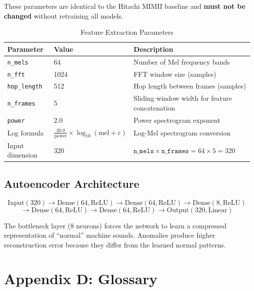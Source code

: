 \documentclass[10pt, a4paper, oneside]{report}
\begin{document}
These parameters are identical to the Hitachi MIMII baseline and \textbf{must not be changed} without retraining all models.

\begin{table}[H]
\centering
\caption{Feature Extraction Parameters}
\label{tab:feature-params}
\begin{tabularx}{\textwidth}{l l X}
  \toprule
  \textbf{Parameter} & \textbf{Value} & \textbf{Description} \\
  \midrule
  \texttt{n\_mels}       & 64    & Number of Mel frequency bands \\
  \texttt{n\_fft}        & 1024  & FFT window size (samples) \\
  \texttt{hop\_length}   & 512   & Hop length between frames (samples) \\
  \texttt{n\_frames}     & 5     & Sliding window width for feature concatenation \\
  \texttt{power}         & 2.0   & Power spectrogram exponent \\
  Log formula            & $\frac{20.0}{\text{power}} \times \log_{10}(\text{mel} + \varepsilon)$ & Log-Mel spectrogram conversion \\
  Input dimension        & 320   & $\texttt{n\_mels} \times \texttt{n\_frames} = 64 \times 5 = 320$ \\
  \bottomrule
\end{tabularx}
\end{table}

\subsection*{Autoencoder Architecture}

\begin{equation*}
  \text{Input}(320) \rightarrow \text{Dense}(64, \text{ReLU}) \rightarrow \text{Dense}(64, \text{ReLU}) \rightarrow \text{Dense}(8, \text{ReLU})
\end{equation*}
\begin{equation*}
  \rightarrow \text{Dense}(64, \text{ReLU}) \rightarrow \text{Dense}(64, \text{ReLU}) \rightarrow \text{Output}(320, \text{Linear})
\end{equation*}

The bottleneck layer (8 neurons) forces the network to learn a compressed representation of ``normal'' machine sounds. Anomalies produce higher reconstruction error because they differ from the learned normal patterns.

\section*{Appendix D: Glossary}
\label{sec:appendix-d}
\end{document}
